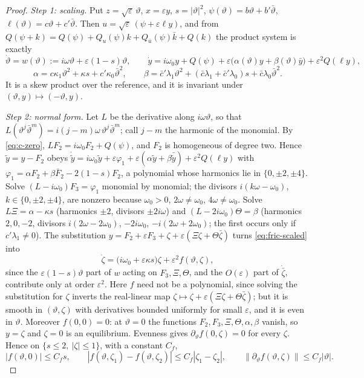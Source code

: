 \documentclass[11pt,reqno]{amsart}
\theoremstyle{plain}
\theoremstyle{definition}
\theoremstyle{remark}
\begin{document}
\begin{proof}
\emph{Step 1: scaling.} Put $z=\sqrt\varepsilon\,\vartheta$, $x=\varepsilon y$, $s=|\vartheta|^{2}$, $\psi(\vartheta)=b\vartheta+b'\bar \vartheta$,
$\ell(\vartheta)=c\vartheta+c'\bar \vartheta$. Then $u=\sqrt\varepsilon\,(\psi+\varepsilon\ell y)$, and from
$Q(\psi+k)=Q(\psi)+Q_u(\psi)k+Q_{\bar u}(\psi)\bar k+Q(k)$ the product system is exactly
\begin{equation}\label{eq:fric-scaled}
  \dot \vartheta=w(\vartheta):=i\omega \vartheta+\varepsilon(1-s)\vartheta,\qquad
  \dot y=i\omega_0y+Q(\psi)+\varepsilon\bigl(\alpha(\vartheta)y+\beta(\vartheta)\bar y\bigr)+\varepsilon^{2}Q(\ell y),
\end{equation}
\[
  \alpha=c\kappa_1\vartheta^{2}+\kappa s+c'\kappa_0\bar \vartheta^{2},\qquad
  \beta=\bar c'\lambda_1\vartheta^{2}+(\bar c\lambda_1+\bar c'\lambda_0)s+\bar c\lambda_0\bar \vartheta^{2}.
\]
It is a skew product over the reference, and it is invariant under $(\vartheta,y)\mapsto(-\vartheta,y)$.

\emph{Step 2: normal form.} Let $L$ be the derivative along $i\omega \vartheta$, so that
$L(\vartheta^{j}\bar \vartheta^{m})=i(j-m)\omega\,\vartheta^{j}\bar \vartheta^{m}$; call $j-m$ the harmonic of the monomial. By \eqref{eq:c-zero},
$LF_2=i\omega_0F_2+Q(\psi)$, and $F_2$ is homogeneous of degree two. Hence $\tilde y=y-F_2$ obeys
$\dot{\tilde y}=i\omega_0\tilde y+\varepsilon\varphi_1+\varepsilon(\alpha\tilde y+\beta\bar{\tilde y})+\varepsilon^{2}Q(\ell y)$ with
$\varphi_1=\alpha F_2+\beta\bar F_2-2(1-s)F_2$, a polynomial whose harmonics lie in $\{0,\pm2,\pm4\}$. Solve
$(L-i\omega_0)F_3=\varphi_1$ monomial by monomial; the divisors $i(k\omega-\omega_0)$, $k\in\{0,\pm2,\pm4\}$, are
nonzero because $\omega_0>0$, $2\omega\ne\omega_0$, $4\omega\ne\omega_0$. Solve $L\Xi=\alpha-\kappa s$ (harmonics $\pm2$,
divisors $\pm2i\omega$) and $(L-2i\omega_0)\Theta=\beta$ (harmonics $2,0,-2$, divisors $i(2\omega-2\omega_0)$, $-2i\omega_0$,
$-i(2\omega+2\omega_0)$; the first occurs only if $c'\lambda_1\ne0$). The substitution
$y=F_2+\varepsilon F_3+\zeta+\varepsilon(\Xi\zeta+\Theta\bar\zeta)$ turns \eqref{eq:fric-scaled} into
\begin{equation}\label{eq:fric-normal}
  \dot\zeta=\bigl(i\omega_0+\varepsilon\kappa s\bigr)\zeta+\varepsilon^{2}f(\vartheta,\zeta),
\end{equation}
since the $\varepsilon(1-s)\vartheta$ part of $w$ acting on $F_3,\Xi,\Theta$, and the $O(\varepsilon)$ part of $\dot{\bar\zeta}$, contribute only at
order $\varepsilon^{2}$. Here $f$ need not be a polynomial, since solving the substitution for $\zeta$ inverts the real-linear map
$\zeta\mapsto\zeta+\varepsilon(\Xi\zeta+\Theta\bar\zeta)$; but it is smooth in $(\vartheta,\zeta)$ with derivatives bounded uniformly for small
$\varepsilon$, and it is even in $\vartheta$. Moreover $f(0,0)=0$: at $\vartheta=0$ the functions $F_2,F_3,\Xi,\Theta,\alpha,\beta$ vanish, so $y=\zeta$ and
$\zeta=0$ is an equilibrium. Evenness gives $\partial_\vartheta f(0,\zeta)=0$ for every $\zeta$. Hence on $\{s\le2,\ |\zeta|\le1\}$, with a
constant $C_f$,
\[
  |f(\vartheta,0)|\le C_fs,\qquad |f(\vartheta,\zeta_1)-f(\vartheta,\zeta_2)|\le C_f|\zeta_1-\zeta_2|,\qquad \|\partial_\vartheta f(\vartheta,\zeta)\|\le C_f|\vartheta| .
\]


\end{proof}
\end{document}
